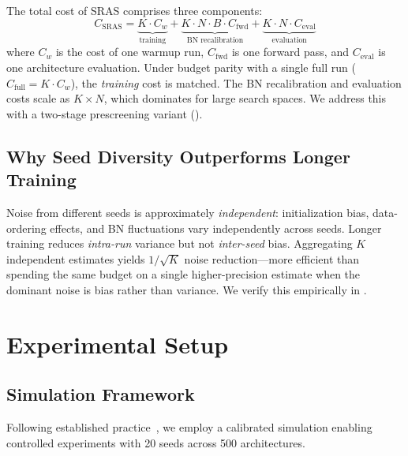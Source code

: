 \documentclass[10pt,twocolumn,letterpaper]{article}
\newcommand{\method}{SRAS}
\begin{document}
The total cost of \method{} comprises three components:
\begin{equation}
    C_{\text{SRAS}} = \underbrace{K \cdot C_w}_{\text{training}} + \underbrace{K \cdot N \cdot B \cdot C_{\text{fwd}}}_{\text{BN recalibration}} + \underbrace{K \cdot N \cdot C_{\text{eval}}}_{\text{evaluation}}
    \label{eq:cost}
\end{equation}
where $C_w$ is the cost of one warmup run, $C_{\text{fwd}}$ is one forward pass, and $C_{\text{eval}}$ is one architecture evaluation.
Under budget parity with a single full run ($C_{\text{full}} = K \cdot C_w$), the \textit{training} cost is matched.
The BN recalibration and evaluation costs scale as $K \times N$, which dominates for large search spaces.
We address this with a two-stage prescreening variant ().

\subsection{Why Seed Diversity Outperforms Longer Training}
\label{sec:intuition}

Noise from different seeds is approximately \textit{independent}: initialization bias, data-ordering effects, and BN fluctuations vary independently across seeds. Longer training reduces \textit{intra-run} variance but not \textit{inter-seed} bias. Aggregating $K$ independent estimates yields $1/\sqrt{K}$ noise reduction---more efficient than spending the same budget on a single higher-precision estimate when the dominant noise is bias rather than variance. We verify this empirically in .

\section{Experimental Setup}
\label{sec:setup}

\subsection{Simulation Framework}
\label{sec:simulation}

Following established practice~\cite{lindauer2020best,zhang2021supernet,dong2020nasbench201}, we employ a calibrated simulation enabling controlled experiments with 20 seeds across 500 architectures.
\end{document}
